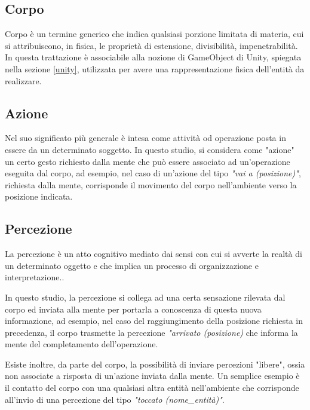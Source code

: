 \subsection{Corpo}

Corpo è un termine generico che indica qualsiasi porzione limitata di materia, cui si attribuiscono, in fisica, le proprietà di estensione, divisibilità, impenetrabilità.\cite{treccani}
In questa trattazione è associabile alla nozione di GameObject di Unity, spiegata nella sezione \ref{unity}, utilizzata per avere una rappresentazione fisica dell'entità da realizzare.

\subsection{Azione}

Nel suo significato più generale è intesa come attività od operazione posta in essere da un determinato soggetto.\cite{treccani}
In questo studio, si considera come "azione" un certo gesto richiesto dalla mente che può essere associato ad un'operazione eseguita dal corpo, ad esempio, nel
caso di un'azione del tipo \textit{"vai a (posizione)"}, richiesta dalla mente, corrisponde il movimento del corpo nell'ambiente verso la posizione indicata.

\subsection{Percezione}

La percezione è un atto cognitivo mediato dai sensi con cui si avverte la realtà di un determinato oggetto e che implica un processo di organizzazione e interpretazione.\cite{treccani}.

\medskip

In questo studio, la percezione si collega ad una certa sensazione rilevata dal corpo ed inviata alla mente per portarla a conoscenza di questa nuova informazione, ad esempio, nel caso del raggiungimento della posizione richiesta in precedenza, il corpo trasmette la percezione \textit{"arrivato (posizione)} che informa la mente del completamento dell'operazione.

\medskip

Esiste inoltre, da parte del corpo, la possibilità di inviare percezioni "libere", ossia non associate a risposta di un'azione inviata dalla mente. Un semplice esempio è il contatto del corpo con una qualsiasi altra entità nell'ambiente che corrisponde all'invio di una percezione del tipo \textit{"toccato (nome\_entità)"}.

